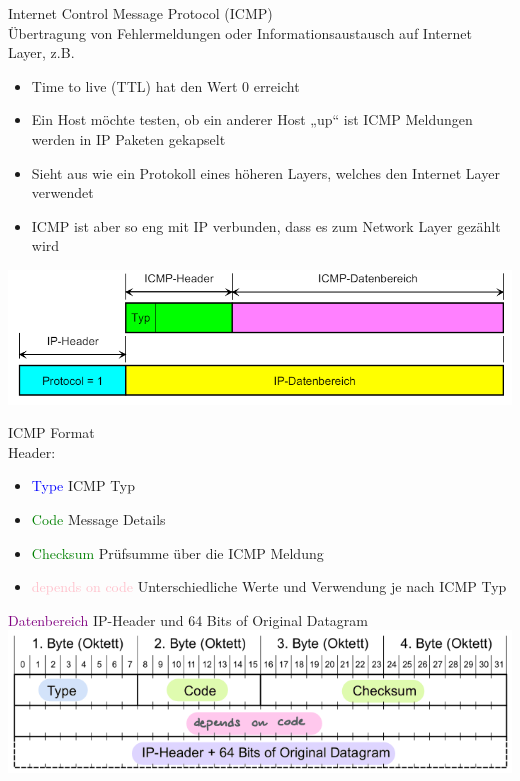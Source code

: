 \begin{concept}{Internet Control Message Protocol (ICMP)}\\
    Übertragung von Fehlermeldungen oder Informationsaustausch auf Internet Layer, z.B.
    \begin{itemize}
        \item Time to live (TTL) hat den Wert 0 erreicht
        \item Ein Host möchte testen, ob ein anderer Host „up“ ist ICMP Meldungen werden in IP Paketen gekapselt
        \item Sieht aus wie ein Protokoll eines höheren Layers, welches den Internet Layer verwendet
        \item ICMP ist aber so eng mit IP verbunden, dass es zum Network Layer gezählt wird
    \end{itemize}
        \includegraphics[width=0.75\linewidth]{images/icmp.png}
\end{concept}

\begin{KR}{ICMP Format}\\
    Header:
    \begin{itemize}
        \item \textcolor{blue}{Type} ICMP Typ
        \item \textcolor{green}{Code} Message Details
        \item \textcolor{green}{Checksum} Prüfsumme über die ICMP Meldung
        \item \textcolor{pink}{depends on code} Unterschiedliche Werte und Verwendung je nach ICMP Typ
    \end{itemize}
    \textcolor{purple}{Datenbereich} IP-Header und 64 Bits of Original Datagram
    \includegraphics[width=1\linewidth]{images/icmp_details.png}
\end{KR}

